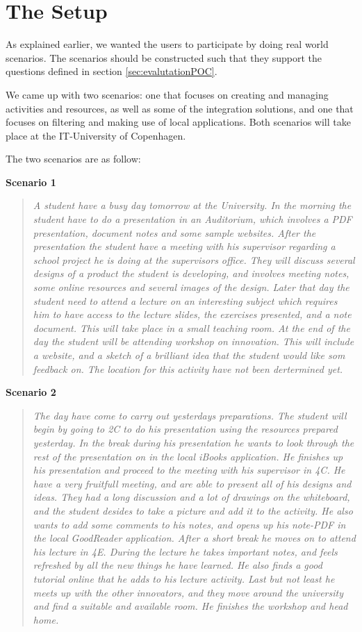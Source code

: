 \section{The Setup}
As explained earlier, we wanted the users to participate by doing real world scenarios. The scenarios should be constructed such that they support the questions defined in section \ref{sec:evalutationPOC}.

We came up with two scenarios: one that focuses on creating and managing activities and resources, as well as some of the integration solutions, and one that focuses on filtering and making use of local applications. Both scenarios will take place at the IT-University of Copenhagen.

The two scenarios are as follow:
\par\vspace{\baselineskip}

\textbf{Scenario 1}
\begin{quotation}
\emph{
A student have a busy day tomorrow at the University. In the morning the student have to do a presentation in an Auditorium, which involves a PDF presentation, document notes and some sample websites. After the presentation the student have a meeting with his supervisor regarding a school project he is doing at the supervisors office. They will discuss several designs of a product the student is developing, and involves meeting notes, some online resources and several images of the design. Later that day the student need to attend a lecture on an interesting subject which requires him to have access to the lecture slides, the exercises presented, and a note document. This will take place in a small teaching room. At the end of the day the student will be attending workshop on innovation. This will include a website, and a sketch of a brilliant idea that the student would like som feedback on. The location for this activity have not been dertermined yet.
}
\end{quotation}

\textbf{Scenario 2}
\begin{quotation}
\emph{
The day have come to carry out yesterdays preparations. The student will begin by going to 2C to do his presentation using the resources prepared yesterday. In the break during his presentation he wants to look through the rest of the presentation on in the local iBooks application. He finishes up his presentation and proceed to the meeting with his supervisor in 4C. He have a very fruitfull meeting, and are able to present all of his designs and ideas. They had a long discussion and a lot of drawings on the whiteboard, and the student desides to take a picture and add it to the activity. He also wants to add some comments to his notes, and opens up his note-PDF in the local GoodReader application. After a short break he moves on to attend his lecture in 4E. During the lecture he takes important notes, and feels refreshed by all the new things he have learned. He also finds a good tutorial online that he adds to his lecture activity. Last but not least he meets up with the other innovators, and they move around the university and find a suitable and available room. He finishes the workshop and head home.
}
\end{quotation}


